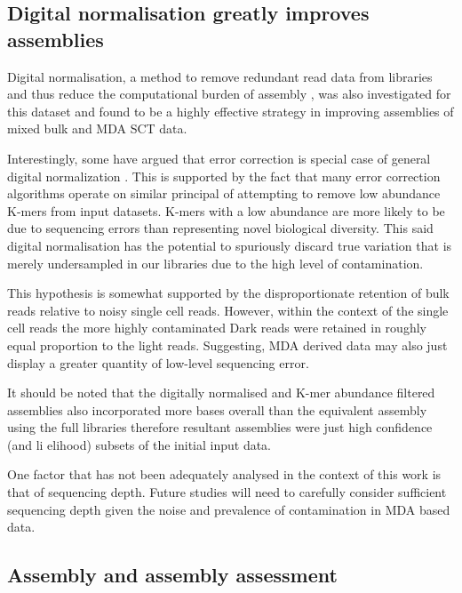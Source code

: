 \subsection{Digital normalisation greatly improves assemblies}

Digital normalisation, a method to remove redundant read data from libraries and thus
reduce the computational burden of assembly \citep{Brown2012}, was also investigated for this dataset
and found to be a highly effective strategy in improving assemblies of mixed bulk and MDA SCT data.

Interestingly, some have argued that error correction is special case of general digital normalization
\citep{Krasileva2013}.  This is supported by the fact that many error correction
algorithms operate on similar principal of attempting to remove low abundance K-mers
from input datasets. K-mers with a low abundance
are more likely to be due to sequencing errors than representing novel biological
diversity.   
This said digital normalisation has the potential to
spuriously discard true variation that is merely undersampled in our libraries
due to the high level of contamination.  

This hypothesis is somewhat supported by the disproportionate 
retention of bulk reads relative to noisy single cell reads.  However,
within the context of the single cell reads the more highly
contaminated Dark reads were retained in roughly equal proportion to the light reads.
Suggesting, MDA derived data may also just display a greater quantity of 
low-level sequencing error.  

It should be noted that the digitally normalised and K-mer abundance filtered assemblies also
incorporated more bases overall than the equivalent assembly using the full
libraries therefore resultant assemblies were just high confidence (and li elihood)
subsets of the initial input data.

One factor that has not been adequately analysed in the context of this work
is that of sequencing depth.  Future studies will need to carefully consider
sufficient sequencing depth given the noise and prevalence of contamination
in MDA based data.


\subsection{Assembly and assembly assessment}

